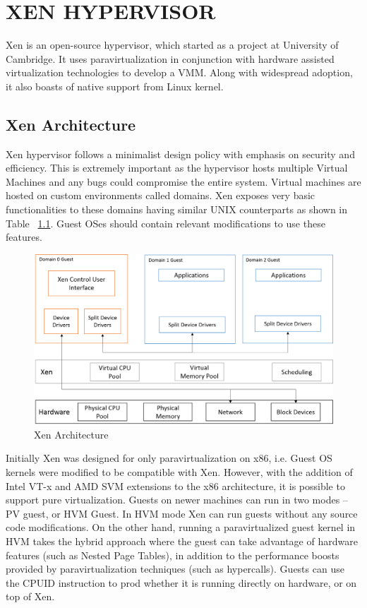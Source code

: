 \chapter{\uppercase{Xen Hypervisor}}

Xen is an open-source hypervisor, which started as a project at University of Cambridge. It uses paravirtualization in conjunction with hardware assisted virtualization technologies to develop a VMM. Along with widespread adoption, it also boasts of native support from Linux kernel.

\section{Xen Architecture}

Xen hypervisor follows a minimalist design policy with emphasis on security and efficiency. This is extremely important as the hypervisor hosts multiple Virtual Machines and any bugs could compromise the entire system. Virtual machines are hosted on custom environments called domains. Xen exposes very basic functionalities to these domains having similar UNIX counterparts as shown in Table ~\ref{tab:unixcomp}. Guest OSes should contain relevant modifications to use these features. 


\begin{figure}
\centering
\includegraphics[scale=0.6]{figures/Xen_model.png}
\caption{Xen Architecture}
\label{tab:unixcomp}
\end{figure}
Initially Xen was designed for only paravirtualization on x86, i.e. Guest OS kernels were modified to be compatible with Xen. However, with the addition of Intel VT-x and AMD SVM extensions to the x86 architecture, it is possible to support pure virtualization. Guests on newer machines can run in two modes -- PV guest, or HVM Guest. In HVM mode Xen can run guests without any source code modifications. On the other hand, running a paravirtualized guest kernel in HVM takes the hybrid approach where the guest can take advantage of hardware features (such as Nested Page Tables), in addition to the performance boosts provided by paravirtualization techniques (such as hypercalls). Guests can use the CPUID instruction to prod whether it is running directly on hardware, or on top of Xen.  

